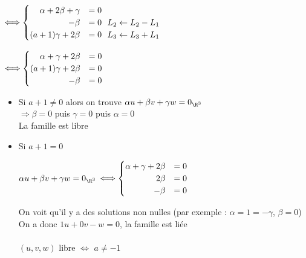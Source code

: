 \documentclass[12pt, a4paper]{report}
\begin{document}
\begin{exemple}[Exemples]
\begin{enumerate}
    \begin{center}
    $\Longleftrightarrow
    \begin{cases}
    \hfill \alpha + 2\beta + \gamma   &=0\\
    \hfill - \beta  &=0 \: \: \: L_2 \leftarrow L_2 - L_1\\
    \hfill (a+1)\gamma + 2\beta &=0 \: \: \: L_3 \leftarrow L_3 + L_1
    \end{cases}
    $
    \end{center}
    
    \begin{center}
    $\Longleftrightarrow
    \begin{cases}
    \hfill \alpha  + \gamma  + 2\beta &=0\\
    \hfill (a+1)\gamma + 2\beta &=0  \\
    \hfill - \beta  &=0
    \end{cases}
    $
    \end{center}
    
    \begin{itemize}
        \item Si $a+1 \neq 0$ alors on trouve $\alpha u + \beta v + \gamma w = 0_{\R^3}$\\
        $\Longrightarrow \beta =0$ puis $\gamma =0$ puis $\alpha =0$\\
        La famille est libre \\
        \item Si $a+1 = 0$ 
        \begin{center}
        $\alpha u + \beta v + \gamma w = 0_{\R^3}$ $\Longleftrightarrow
        \begin{cases}
        \hfill \alpha  + \gamma  + 2\beta &=0\\
        \hfill 2\beta &=0  \\
        \hfill - \beta  &=0
        \end{cases}
        $
        \end{center}
    On voit qu'il y a des solutions non nulles (par exemple : $\alpha =1 = - \gamma$, $\beta =0$)\\
    On a donc $1u+0v-w=0$, la famille est liée\\
    \\
     $(u,v,w)$ libre $\Longleftrightarrow$ $a\neq -1 $
    \end{itemize}
    

\end{enumerate}
\end{exemple}
\end{document}
